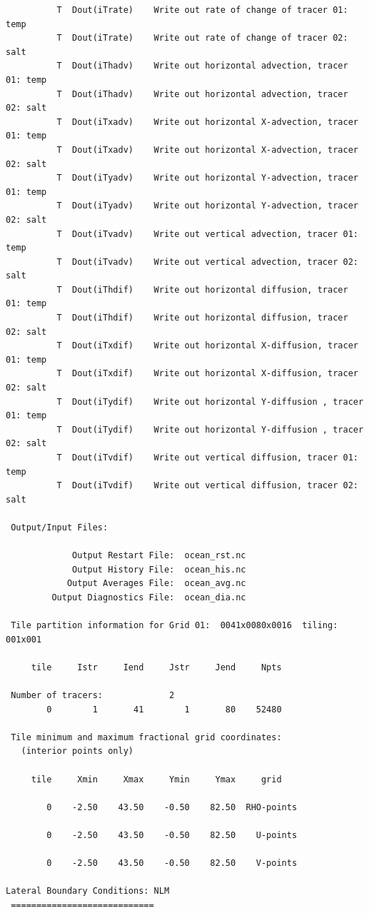 \begin{verbatim}
          T  Dout(iTrate)    Write out rate of change of tracer 01: temp
          T  Dout(iTrate)    Write out rate of change of tracer 02: salt
          T  Dout(iThadv)    Write out horizontal advection, tracer 01: temp
          T  Dout(iThadv)    Write out horizontal advection, tracer 02: salt
          T  Dout(iTxadv)    Write out horizontal X-advection, tracer 01: temp
          T  Dout(iTxadv)    Write out horizontal X-advection, tracer 02: salt
          T  Dout(iTyadv)    Write out horizontal Y-advection, tracer 01: temp
          T  Dout(iTyadv)    Write out horizontal Y-advection, tracer 02: salt
          T  Dout(iTvadv)    Write out vertical advection, tracer 01: temp
          T  Dout(iTvadv)    Write out vertical advection, tracer 02: salt
          T  Dout(iThdif)    Write out horizontal diffusion, tracer 01: temp
          T  Dout(iThdif)    Write out horizontal diffusion, tracer 02: salt
          T  Dout(iTxdif)    Write out horizontal X-diffusion, tracer 01: temp
          T  Dout(iTxdif)    Write out horizontal X-diffusion, tracer 02: salt
          T  Dout(iTydif)    Write out horizontal Y-diffusion , tracer 01: temp
          T  Dout(iTydif)    Write out horizontal Y-diffusion , tracer 02: salt
          T  Dout(iTvdif)    Write out vertical diffusion, tracer 01: temp
          T  Dout(iTvdif)    Write out vertical diffusion, tracer 02: salt

 Output/Input Files:

             Output Restart File:  ocean_rst.nc
             Output History File:  ocean_his.nc
            Output Averages File:  ocean_avg.nc
         Output Diagnostics File:  ocean_dia.nc

 Tile partition information for Grid 01:  0041x0080x0016  tiling: 001x001

     tile     Istr     Iend     Jstr     Jend     Npts

 Number of tracers:             2
        0        1       41        1       80    52480

 Tile minimum and maximum fractional grid coordinates:
   (interior points only)

     tile     Xmin     Xmax     Ymin     Ymax     grid

        0    -2.50    43.50    -0.50    82.50  RHO-points

        0    -2.50    43.50    -0.50    82.50    U-points

        0    -2.50    43.50    -0.50    82.50    V-points

Lateral Boundary Conditions: NLM
 ============================


\end{verbatim}
